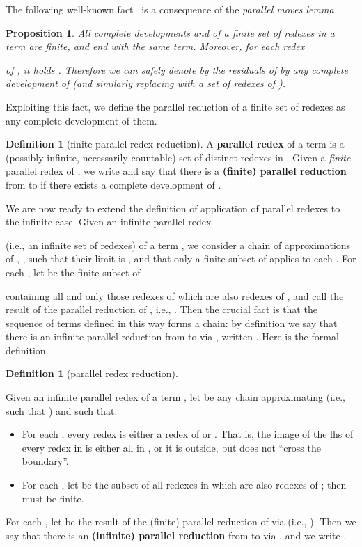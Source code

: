 \documentclass{eptcs}
\theoremstyle{plain}
\newtheorem{proposition}[theorem]{Proposition}
\theoremstyle{definition}
\newtheorem{definition}[theorem]{Definition}
\begin{document}
The following well-known fact~\cite{DBLP:journals/jacm/BerryL79} is a  
consequence of the {\em parallel moves lemma}~\cite{curry-feys:combinatory-logic}.

\begin{proposition}
All complete developments  and  of a finite set of redexes 
 in a 
term  
are finite, and end with the same term. Moreover, for each redex 
 
of , it holds . 
Therefore 
we can safely denote by  the residuals of 
 by any complete development of  (and similarly 
replacing 
 with a set of redexes  of ). 
\end{proposition}

Exploiting this fact, we define the parallel reduction  
of a finite set of redexes as any complete development of them.


\begin{definition} [finite parallel redex reduction]
\label{de:parallel-rdx}
A {\bf parallel redex}  of a term  is a (possibly infinite, 
necessarily
countable) set of distinct redexes in .  
Given a {\em finite} parallel redex  of , we write  and say that there is a {\bf (finite) parallel 
reduction} 
from  
to  if there exists a complete development  of .
\end{definition} 

We are now ready to extend the definition of application 
of parallel redexes to the infinite case. 
Given an infinite parallel redex 
 
(i.e., an infinite set of redexes) of a term , we consider a chain 
of 
approximations of , , such that their 
limit is , and that only a finite subset of  applies to each 
. For each , let  be the finite subset of 
 
containing all and only those redexes of  which are also redexes of 
, and call  the result of the parallel reduction of 
, 
i.e., . Then the crucial fact is that 
the  
sequence of terms  defined in this way forms a chain: by definition we 
say 
that there is an infinite parallel reduction from  to  via , written .
Here is the formal definition.



\begin{definition}
[parallel redex reduction]
\label{de:par-rdx-app}

Given an infinite parallel redex  of a term ,
let   be any chain approximating 
 (i.e., such that ) and such that:

\begin{itemize}
\item For each , every redex   is either 
a 
redex of  or . That is, the image of the lhs of 
every 
redex in  is either all in , or it is outside, but does not 
``cross the boundary''.  

\item For each , let  be the subset 
of 
all redexes in  which are also redexes of ; then  
must be 
finite.
\end{itemize}

\noindent 
For each , let  be the result of 
the (finite) parallel reduction of  via  (i.e., ). Then we say that there is an 
{\bf (infinite) parallel reduction} from  
to  via , and we 
write 
. 
\end{definition}
\end{document}
